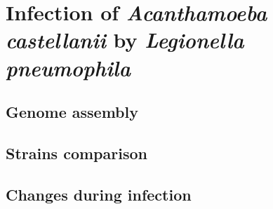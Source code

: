 
\chapter{Infection of \textit{Acanthamoeba castellanii} by \textit{Legionella pneumophila}} %

\label{ch:02-02} %


\section{Genome assembly}

\section{Strains comparison}

\section{Changes during infection}

\blindtext